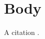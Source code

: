 \documentclass{article}
\begin{document}
\section{Body}
A citation \cite{knuth1984}.



\end{document}

